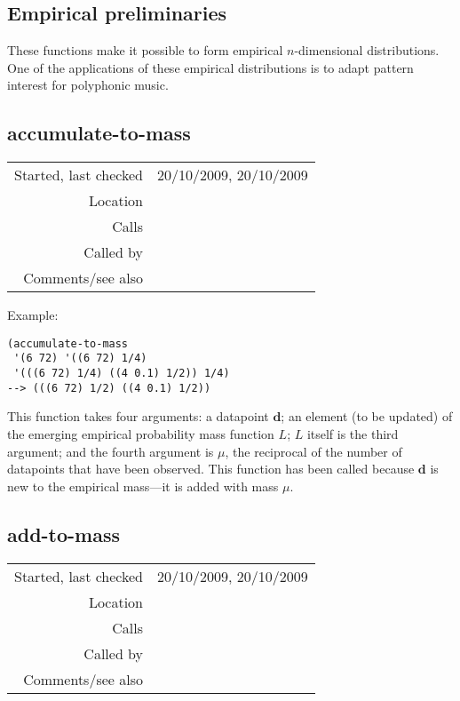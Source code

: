 \subsection{Empirical preliminaries}\label{sec:empirical-preliminaries}

These functions make it possible to form empirical
$n$-dimensional distributions. One of the applications
of these empirical distributions is to adapt pattern
interest \citep*{conklin2008a} for polyphonic
music.


\subsection*{accumulate-to-mass}\label{fun:accumulate-to-mass}

\vspace{0.3cm}
\begin{tabular}{r|p{8cm}}
Started, last checked & 20/10/2009, 20/10/2009 \\
Location & \nameref{sec:empirical-preliminaries} \\
Calls & \\
Called by & \nameref{fun:present-to-mass} \\
Comments/see also & \nameref{fun:add-to-mass}
\end{tabular}

\vspace{0.5cm}
\noindent Example:
\begin{verbatim}
(accumulate-to-mass
 '(6 72) '((6 72) 1/4)
 '(((6 72) 1/4) ((4 0.1) 1/2)) 1/4)
--> (((6 72) 1/2) ((4 0.1) 1/2))
\end{verbatim}

\noindent This function takes four arguments: a
datapoint $\mathbf{d}$; an element (to be updated) of
the emerging empirical probability mass function $L$;
$L$ itself is the third argument; and the fourth
argument is $\mu$, the reciprocal of the number of
datapoints that have been observed. This function has
been called because $\mathbf{d}$ is new to the
empirical mass---it is added with mass $\mu$.


\subsection*{add-to-mass}\label{fun:add-to-mass}

\vspace{0.3cm}
\begin{tabular}{r|p{8cm}}
Started, last checked & 20/10/2009, 20/10/2009 \\
Location & \nameref{sec:empirical-preliminaries} \\
Calls & \\
Called by & \nameref{fun:present-to-mass} \\
Comments/see also & \nameref{fun:accumulate-to-mass}
\end{tabular}

